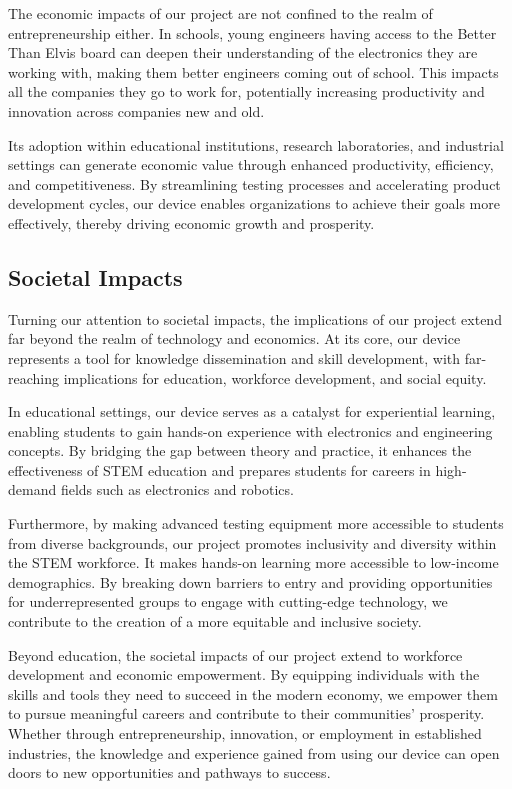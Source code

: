 The economic impacts of our project are not confined to the realm of entrepreneurship either. In schools, young engineers having access to the Better Than Elvis board can deepen their understanding of the electronics they are working with, making them better engineers coming out of school. This impacts all the companies they go to work for, potentially increasing productivity and innovation across companies new and old.

Its adoption within educational institutions, research laboratories, and industrial settings can generate economic value through enhanced productivity, efficiency, and competitiveness. By streamlining testing processes and accelerating product development cycles, our device enables organizations to achieve their goals more effectively, thereby driving economic growth and prosperity.

\subsection{Societal Impacts}

Turning our attention to societal impacts, the implications of our project extend far beyond the realm of technology and economics. At its core, our device represents a tool for knowledge dissemination and skill development, with far-reaching implications for education, workforce development, and social equity.

In educational settings, our device serves as a catalyst for experiential learning, enabling students to gain hands-on experience with electronics and engineering concepts. By bridging the gap between theory and practice, it enhances the effectiveness of STEM education and prepares students for careers in high-demand fields such as electronics and robotics.

Furthermore, by making advanced testing equipment more accessible to students from diverse backgrounds, our project promotes inclusivity and diversity within the STEM workforce. It makes hands-on learning more accessible to low-income demographics. By breaking down barriers to entry and providing opportunities for underrepresented groups to engage with cutting-edge technology, we contribute to the creation of a more equitable and inclusive society.

Beyond education, the societal impacts of our project extend to workforce development and economic empowerment. By equipping individuals with the skills and tools they need to succeed in the modern economy, we empower them to pursue meaningful careers and contribute to their communities' prosperity. Whether through entrepreneurship, innovation, or employment in established industries, the knowledge and experience gained from using our device can open doors to new opportunities and pathways to success.

